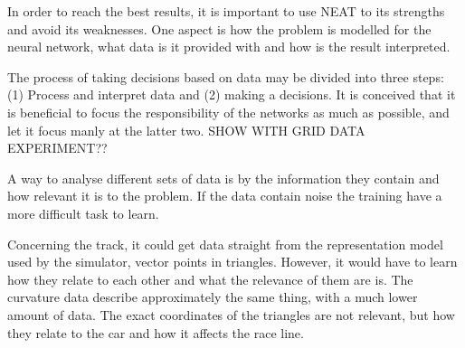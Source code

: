 

In order to reach the best results, it is important to use NEAT to its strengths and avoid its weaknesses. One aspect is how the problem is modelled for the neural network, what data is it provided with and how is the result interpreted.

The process of taking decisions based on data may be divided into three steps: (1) Process and interpret data and (2) making a decisions. It is conceived that it is beneficial to focus the responsibility of the networks as much as possible, and let it focus manly at the latter two. SHOW WITH GRID DATA EXPERIMENT??

A way to analyse different sets of data is by the information they contain and how relevant it is to the problem. If the data contain noise the training have a more difficult task to learn.

Concerning the track, it could get data straight from the representation model used by the simulator, vector points in triangles. However, it would have to learn how they relate to each other and what the relevance of them are is. The curvature data describe approximately the same thing, with a much lower amount of data. The exact coordinates of the triangles are not relevant, but how they relate to the car and how it affects the race line. 

